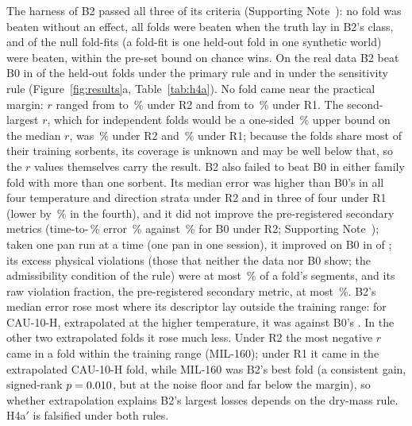 \documentclass[12pt]{article}
\begin{document}
The harness of B2 passed all three of its criteria (Supporting Note~): no fold was beaten without an
effect, all  folds were beaten when the truth lay in B2's class, and  of the
 null fold-fits (a fold-fit is one held-out fold in one synthetic world) were beaten, within the
pre-set bound on chance wins. On the real data B2 beat B0 in  of the
 held-out folds under the primary rule and in  under the sensitivity rule
(Figure~\ref{fig:results}a, Table~\ref{tab:h4a}). No fold came near the practical margin: $r$ ranged from
 to \,\% under R2 and from  to \,\%
under R1. The second-largest $r$, which for independent folds would be a one-sided \,\% upper bound
on the median $r$, was \,\% under R2 and \,\% under R1; because the folds share
most of their training sorbents, its coverage is unknown and may be well below that, so the $r$ values themselves carry
the result. B2 also
failed to beat B0 in either family fold with more than one sorbent. Its median error was higher than B0's in all four temperature and direction strata
under R2 and in three of four under R1 (lower by \,\% in the fourth), and it did not improve the
pre-registered secondary metrics (time-to-\,\% error \,\% against
\,\% for B0 under R2; Supporting Note~); taken one pan run at a time (one pan in one
session), it improved on B0 in  of ; its excess physical violations (those that neither
the data nor B0 show; the admissibility condition of the rule) were at most \,\% of a fold's
segments, and its raw violation fraction, the pre-registered secondary metric, at most \,\%. B2's median error
rose most where its descriptor lay outside the training range: for CAU-10-H, extrapolated at the higher temperature,
it was  against B0's . In the other two extrapolated folds it rose much
less. Under R2 the most negative $r$ came in a fold within the training range (MIL-160); under R1 it came in the
extrapolated CAU-10-H fold, while MIL-160 was B2's best fold (a consistent gain, signed-rank
$p = \V{res_mil_p_r1}{0.010}$, but at the noise floor and far below the margin), so whether extrapolation explains B2's
largest losses depends on the dry-mass rule. H4a$'$ is falsified under both rules.
\end{document}
